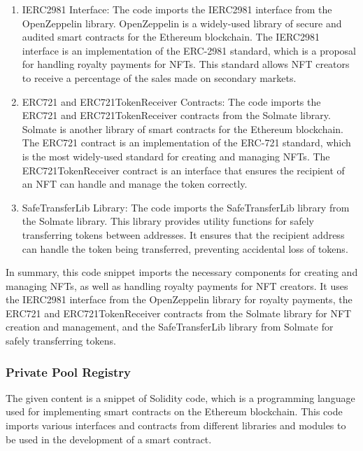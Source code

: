 \begin{enumerate}
\def\labelenumi{\arabic{enumi}.}
\item
  IERC2981 Interface: The code imports the IERC2981 interface from the
  OpenZeppelin library. OpenZeppelin is a widely-used library of secure
  and audited smart contracts for the Ethereum blockchain. The IERC2981
  interface is an implementation of the ERC-2981 standard, which is a
  proposal for handling royalty payments for NFTs. This standard allows
  NFT creators to receive a percentage of the sales made on secondary
  markets.
\item
  ERC721 and ERC721TokenReceiver Contracts: The code imports the ERC721
  and ERC721TokenReceiver contracts from the Solmate library. Solmate is
  another library of smart contracts for the Ethereum blockchain. The
  ERC721 contract is an implementation of the ERC-721 standard, which is
  the most widely-used standard for creating and managing NFTs. The
  ERC721TokenReceiver contract is an interface that ensures the
  recipient of an NFT can handle and manage the token correctly.
\item
  SafeTransferLib Library: The code imports the SafeTransferLib library
  from the Solmate library. This library provides utility functions for
  safely transferring tokens between addresses. It ensures that the
  recipient address can handle the token being transferred, preventing
  accidental loss of tokens.
\end{enumerate}

In summary, this code snippet imports the necessary components for
creating and managing NFTs, as well as handling royalty payments for NFT
creators. It uses the IERC2981 interface from the OpenZeppelin library
for royalty payments, the ERC721 and ERC721TokenReceiver contracts from
the Solmate library for NFT creation and management, and the
SafeTransferLib library from Solmate for safely transferring tokens.

\hypertarget{private-pool-registry}{%
\subsubsection{Private Pool Registry}\label{private-pool-registry}}

The given content is a snippet of Solidity code, which is a programming
language used for implementing smart contracts on the Ethereum
blockchain. This code imports various interfaces and contracts from
different libraries and modules to be used in the development of a smart
contract.

